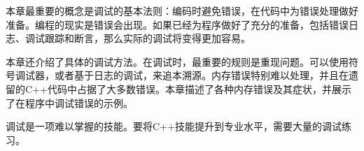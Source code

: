 本章最重要的概念是调试的基本法则：编码时避免错误，在代码中为错误处理做好准备。编程的现实是错误会出现。如果已经为程序做好了充分的准备，包括错误日志、调试跟踪和断言，那么实际的调试将变得更加容易。

本章还介绍了具体的调试方法。在调试时，最重要的规则是重现问题。可以使用符号调试器，或者基于日志的调试，来追本溯源。内存错误特别难以处理，并且在遗留的C++代码中占据了大多数错误。本章描述了各种内存错误及其症状，并展示了在程序中调试错误的示例。

调试是一项难以掌握的技能。要将C++技能提升到专业水平，需要大量的调试练习。



